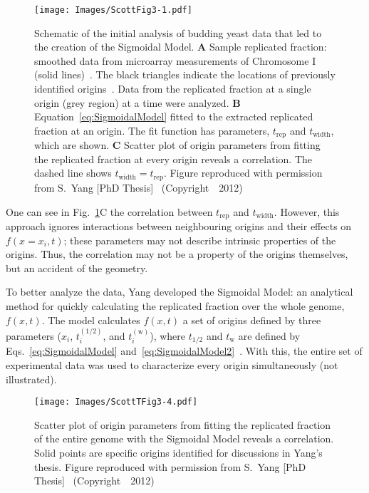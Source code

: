 {	\begin{figure}[tbh]
		\begin{center}
			\texttt{[image: Images/ScottFig3-1.pdf]}
		\end{center}
			\caption[Early analysis of budding yeast]{\label{fig:SigmoidalModel} Schematic of the initial analysis of budding yeast data that led to the creation of the Sigmoidal Model.
				\textbf{A} Sample replicated fraction: smoothed data from microarray measurements of Chromosome I (solid lines)~\cite{McCuneMicroArray}.
				The black triangles indicate the locations of previously identified origins~\cite{OriginLocations}.
				Data from the replicated fraction at a single origin (grey region) at a time were analyzed.
				\textbf{B} Equation~\ref{eq:SigmoidalModel} fitted to the extracted replicated fraction at an origin.
				The fit function has parameters, $t_{\text{rep}}$ and $t_{\text{width}}$, which are shown.
				\textbf{C} Scatter plot of origin parameters from fitting the replicated fraction at every origin reveals a correlation.
				The dashed line shows $t_{\text{width}}=t_{\text{rep}}$.
				Figure reproduced with permission from S.~Yang [PhD Thesis]~\cite{ScottsThesis} (Copyright~\textcopyright~2012)}
	\end{figure}
	
	One can see in Fig.~\ref{fig:SigmoidalModel}C the correlation between $t_\text{rep}$ and $t_\text{width}$.
	However, this approach ignores interactions between neighbouring origins and their effects on $f(x=x_i,t)$; these parameters may not describe intrinsic properties of the origins.
	Thus, the correlation may not be a property of the origins themselves, but an accident of the geometry.
	
	To better analyze the data, Yang developed the Sigmoidal Model: an analytical method for quickly calculating the replicated fraction over the whole genome, $f(x,t)$.
	The model calculates $f(x,t)$ a set of origins defined by three parameters ($x_i$, $t_i^{(1/2)}$, and $t^{(\text{w})}_i$), where $t_{1/2}$ and $t_\text{w}$ are defined by Eqs.~\ref{eq:SigmoidalModel} and~\ref{eq:SigmoidalModel2}~\cite{ScottsThesis}.
	With this, the entire set of experimental data was used to characterize every origin simultaneously (not illustrated).
	
	\begin{SCfigure}[1][tbh]
		\texttt{[image: Images/ScottTFig3-4.pdf]}
		\caption[Sigmoidal model]{\label{fig:SigmoidalModel2} Scatter plot of origin parameters from fitting the replicated fraction of the entire genome with the Sigmoidal Model reveals a correlation.
			Solid points are specific origins identified for discussions in Yang's thesis.
			Figure reproduced with permission from S.~Yang [PhD Thesis]~\cite{ScottsThesis} (Copyright~\textcopyright~2012)}
	\end{SCfigure}
	
}
